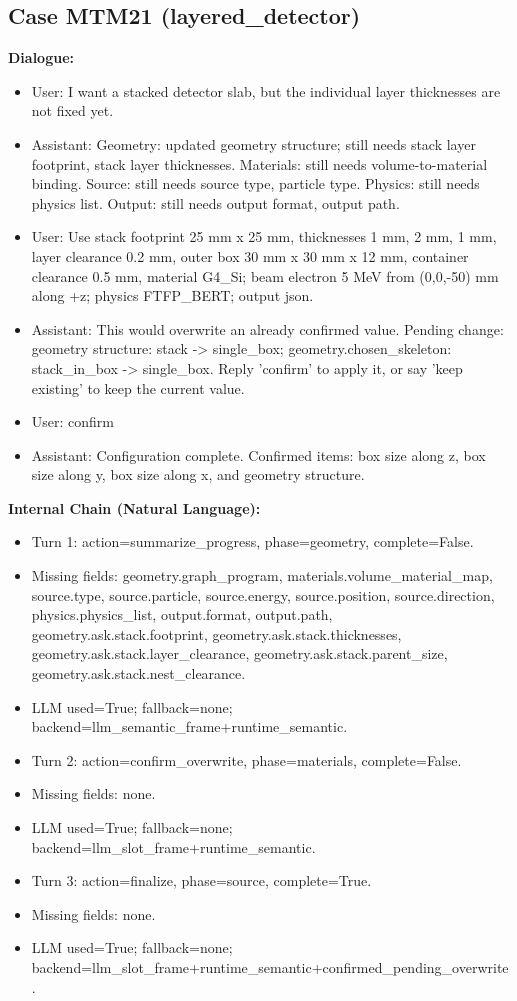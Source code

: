 \documentclass[11pt]{ctexart}
\begin{document}
\subsection{Case MTM21 (layered\_detector)}
\textbf{Dialogue:}
\begin{itemize}
\item User: I want a stacked detector slab, but the individual layer thicknesses are not fixed yet.
\item Assistant: Geometry: updated geometry structure; still needs stack layer footprint, stack layer thicknesses. Materials: still needs volume-to-material binding. Source: still needs source type, particle type. Physics: still needs physics list. Output: still needs output format, output path.
\item User: Use stack footprint 25 mm x 25 mm, thicknesses 1 mm, 2 mm, 1 mm, layer clearance 0.2 mm, outer box 30 mm x 30 mm x 12 mm, container clearance 0.5 mm, material G4\_Si; beam electron 5 MeV from (0,0,-50) mm along +z; physics FTFP\_BERT; output json.
\item Assistant: This would overwrite an already confirmed value. Pending change: geometry structure: stack -> single\_box; geometry.chosen\_skeleton: stack\_in\_box -> single\_box. Reply 'confirm' to apply it, or say 'keep existing' to keep the current value.
\item User: confirm
\item Assistant: Configuration complete. Confirmed items: box size along z, box size along y, box size along x, and geometry structure.
\end{itemize}
\textbf{Internal Chain (Natural Language):}
\begin{itemize}
\item Turn 1: action=summarize\_progress, phase=geometry, complete=False.
\item Missing fields: geometry.graph\_program, materials.volume\_material\_map, source.type, source.particle, source.energy, source.position, source.direction, physics.physics\_list, output.format, output.path, geometry.ask.stack.footprint, geometry.ask.stack.thicknesses, geometry.ask.stack.layer\_clearance, geometry.ask.stack.parent\_size, geometry.ask.stack.nest\_clearance.
\item LLM used=True; fallback=none; backend=llm\_semantic\_frame+runtime\_semantic.
\item Turn 2: action=confirm\_overwrite, phase=materials, complete=False.
\item Missing fields: none.
\item LLM used=True; fallback=none; backend=llm\_slot\_frame+runtime\_semantic.
\item Turn 3: action=finalize, phase=source, complete=True.
\item Missing fields: none.
\item LLM used=True; fallback=none; backend=llm\_slot\_frame+runtime\_semantic+confirmed\_pending\_overwrite.
\end{itemize}
\end{document}
